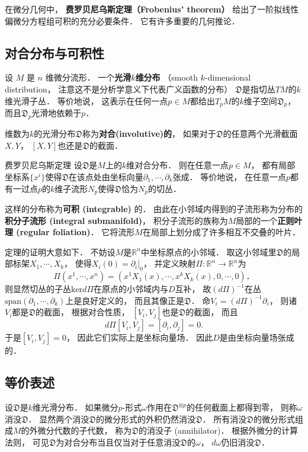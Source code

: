 

在微分几何中， \textbf{费罗贝尼乌斯定理（Frobenius' theorem）} 给出了一阶拟线性偏微分方程组可积的充分必要条件． 它有许多重要的几何推论．

\subsection{对合分布与可积性}
设 $M$ 是 $n$ 维微分流形． 一个\textbf{光滑$k$维分布} （smooth $k$-dimensional distribution， 注意这不是分析学意义下代表广义函数的分布） $\mathfrak{D}$是指切丛$TM$的$k$维光滑子丛． 等价地说， 这表示在任何一点$p\in M$都给出$T_pM$的$k$维子空间$\mathfrak{D}_p$， 而且$\mathfrak{D}_p$光滑地依赖于$p$． 

维数为$k$的光滑分布$\mathfrak{D}$称为\textbf{对合(involutive)的}， 如果对于$\mathfrak{D}$的任意两个光滑截面$X,Y$， $[X,Y]$也还是$\mathfrak{D}$的截面． 

\begin{theorem}{费罗贝尼乌斯定理}
设$\mathfrak{D}$是$M$上的$k$维对合分布． 则在任意一点$p\in M$， 都有局部坐标系$\{x^i\}$使得$\mathfrak{D}$在该点处由坐标向量$\partial_1,\cdots ,\partial_k$张成． 等价地说， 在任意一点$p$都有一过点$p$的$k$维子流形$N_p$使得$\mathfrak{D}$恰为$N_p$的切丛．
\end{theorem}
这样的分布称为\textbf{可积 (integrable)} 的． 由此在小邻域内得到的子流形称为分布的\textbf{积分子流形 (integral submanifold)}， 积分子流形的族称为$M$局部的一个\textbf{正则叶理 (regular foliation)}． 它将流形$M$在局部上划分成了许多相互不交叠的叶片．

定理的证明大意如下． 不妨设$M$是$\mathbb{R}^n$中坐标原点的小邻域． 取这小邻域里$\mathfrak{D}$的局部标架$X_1,\cdots ,X_k$， 使得$X_i(0)=\partial_i|_0$， 并定义映射$\Pi: \mathbb{R}^n\to \mathbb{R}^n$为
$$
\Pi(x^1,\cdots ,x^n)=(x^1X_1(x),\cdots ,x^kX_k(x),0,\cdots ,0)．
$$
则显然切丛的子丛$\text{ker}d\Pi$在原点的小邻域内与$D$互补， 故$(d\Pi)^{-1}$在丛$\text{span}(\partial_1,\cdots ,\partial_k)$上是良好定义的， 而且其像正是$\mathfrak{D}$． 命$V_i=(d\Pi)^{-1}\partial_i$， 则诸$V_i$都是$\mathfrak{D}$的截面， 根据对合性质， $[V_i,V_j]$也是$\mathfrak{D}$的截面， 而且
$$
d\Pi[V_i,V_j]=[\partial_i,\partial_j]=0.
$$
于是$[V_i,V_j]=0$， 因此它们实际上是坐标向量场． 因此$D$是由坐标向量场张成的． 

\subsection{等价表述}
设$\mathfrak{D}$是$k$维光滑分布． 如果微分$p$-形式$\omega$作用在$\mathfrak{D}^{\otimes p}$的任何截面上都得到零， 则称$\omega$消没$\mathfrak{D}$． 显然两个消没$\mathfrak{D}$的微分形式的外积仍然消没$\mathfrak{D}$． 所有消没$\mathfrak{D}$的微分形式组成$M$的外微分代数的子代数， 称为$\mathfrak{D}$的消没子 (annihilator)． 根据外微分的计算法则， 可见$\mathfrak{D}$为对合分布当且仅当对于任意消没$\mathfrak{D}$的$\omega$， $d\omega$仍旧消没$\mathfrak{D}$． 

